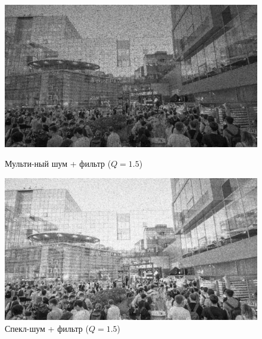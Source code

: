 \documentclass[a4paper]{article}
\begin{document}
\begin{figure}[H]
    \begin{minipage}{0.49\textwidth}
        \centering \includegraphics[width=\textwidth]{images/2_low_filters/multiplicative - contrharmonic (Q=1.5).jpg}
        \caption{Мульти-ный шум + фильтр ($Q = 1.5$)}
    \end{minipage}\hfill
    \begin{minipage}{0.49\textwidth}
        \centering \includegraphics[width=\textwidth]{images/2_low_filters/speckle - contrharmonic (Q=1.5).jpg}
        \caption{Спекл-шум + фильтр ($Q = 1.5$)}
    \end{minipage}
\end{figure}
\end{document}

